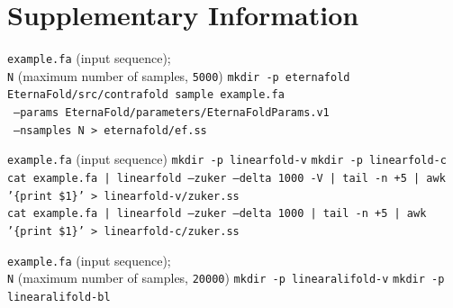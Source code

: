 \documentclass[%
aip,
 amsmath,amssymb,
reprint,%
onecolumn,
]{revtex4-1}
\begin{document}
{%

\clearpage
\onecolumngrid


\section*{Supplementary Information}

\begin{algorithm}[H]
  \caption{Sampling RNA Secondary Structures with \texttt{EternaFold}}
  \label{alg:eternafold-sampling}
  \begin{algorithmic}[1]
    \REQUIRE \texttt{example.fa} (input sequence);\\
    \texttt{N} (maximum number of samples, \texttt{5000})
    \STATE \texttt{mkdir -p eternafold}
    \STATE \texttt{EternaFold/src/contrafold sample example.fa} \\
    \ \texttt{--params EternaFold/parameters/EternaFoldParams.v1} \\
    \ \texttt{--nsamples N > eternafold/ef.ss}
  \end{algorithmic}
\end{algorithm}

\begin{algorithm}[H]
  \caption{Sampling RNA Secondary Structures with \texttt{LinearFold}}
  \label{alg:linearfold-sampling}
  \begin{algorithmic}[1]
    \REQUIRE \texttt{example.fa} (input sequence)
    \STATE \texttt{mkdir -p linearfold-v}
    \STATE \texttt{mkdir -p linearfold-c}
    \STATE \texttt{cat example.fa | linearfold --zuker --delta 1000 -V | tail -n +5 | awk '\{print \$1\}' > linearfold-v/zuker.ss} \\
    \STATE \texttt{cat example.fa | linearfold --zuker --delta 1000       | tail -n +5 | awk '\{print \$1\}' > linearfold-c/zuker.ss}
  \end{algorithmic}
\end{algorithm}

\begin{algorithm}[H]
  \caption{Sampling RNA Secondary Structures with \texttt{LinearAliFold}}
  \label{alg:linearalifold-sampling}
  \begin{algorithmic}[1]
    \REQUIRE \texttt{example.fa} (input sequence);\\
    \texttt{N} (maximum number of samples, \texttt{20000})
    \STATE \texttt{mkdir -p linearalifold-v}
    \STATE \texttt{mkdir -p linearalifold-bl}


\end{algorithmic}
\end{algorithm}}
\end{document}
